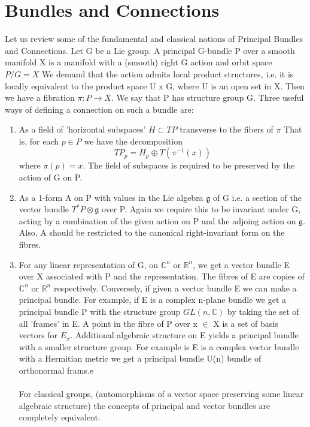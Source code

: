 \section{Bundles and Connections}
Let us review some of the fundamental and classical notions of Principal Bundles and Connections.
Let G be a Lie group. A principal G-bundle P over a smooth manifold X is a manifold with a (smooth) right G
action and orbit space $P/G = X$
   We demand that the action admits local product structures, i.e. it is locally
   equivalent to the product space U x G, where U is an open set in X. Then we have a fibration 
   $\pi: P \rightarrow X$. We say that P has structure group G.
 Three useful ways of defining a connection on such a bundle are:
 \begin{enumerate}
  \item As a field of 'horizontal subspaces' $H \subset TP$ transverse to the fibers of $\pi$
  That is, for each $p \in P$ we have the decomposition
  \begin{equation*}
   TP_{p} = H_p \oplus T(\pi^{-1}(x))
  \end{equation*}
where $\pi(p) = x$. The field of subspaces is required to be preserved by the action of G on P. 
\item As a 1-form A on P with values in the Lie algebra $\mathfrak{g}$ of G i.e. a section of the 
vector bundle 
$T^*P \otimes \mathfrak{g}$
over P. Again we require this to be invariant under G, acting by a combination of the given action on P and
the adjoing action on $\mathfrak{g}$. Also, A should be restricted to the canonical right-invariant form on the 
fibres.
\item For any linear representation of G, on $\mathbb{C}^n$ or $\mathbb{R}^n$, we get a vector bundle E over X 
associated with P and the representation. The fibres of E are copies of $\mathbb{C}^n$ or $\mathbb{R}^n$ respectively. 
Conversely, if given a vector bundle E we can make a principal bundle. For example, if E is a complex
n-plane bundle we get a principal bundle P with the structure group $GL(n,\mathbb{C})$ by taking the set of 
all 'frames' in E. A point in the fibre of P over x $\in$ X is a set of basis vectors for $E_x$. Additional algebraic
structure on E yields a principal bundle with a smaller structure group. For example is E is a complex vector bundle with
a Hermitian metric we get a principal bundle U(n) bundle of orthonormal frams.e 
   \paragraph{} For classical groups, (automorphisms of a vector space preserving some linear algebraic structure)
   the concepts of principal and vector bundles are completely equivalent. 

 \end{enumerate}
